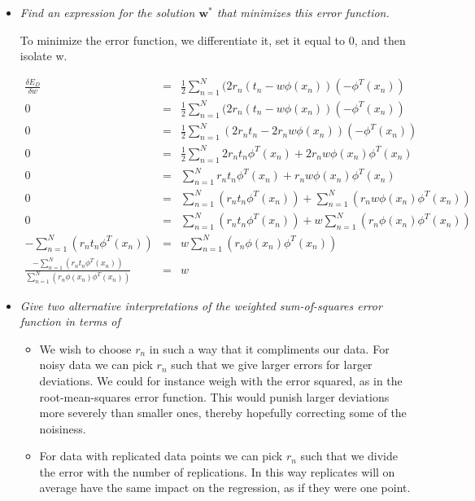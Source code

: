 \documentclass[12pt, a4paper]{article}
\begin{document}
\begin{itemize}
\item \textit{Find an expression for the solution $\textbf{w}^*$ that minimizes this error function.}

To minimize the error function, we differentiate it, set it equal to 0, and then isolate w.

\begin{eqnarray}
	\frac{\delta E_D}{\delta w} &=& \frac{1}{2}\sum^N_{n=1}(2r_n(t_n - w \phi (x_n))(-\phi^T (x_n))\\
	0 &=& \frac{1}{2}\sum^N_{n=1}(2r_n(t_n - w \phi (x_n))(-\phi^T (x_n))\\
	0 &=& \frac{1}{2}\sum^N_{n=1}(2r_nt_n - 2r_nw \phi (x_n))(-\phi^T (x_n))\\
	0 &=& \frac{1}{2}\sum^N_{n=1}2r_nt_n\phi^T (x_n) + 2r_nw \phi (x_n) \phi^T (x_n)\\	
	0 &=& \sum^N_{n=1}r_nt_n\phi^T (x_n) + r_nw \phi (x_n) \phi^T (x_n)\\
	0 &=& \sum^N_{n=1}(r_nt_n\phi^T (x_n)) + \sum^N_{n=1}(r_nw \phi (x_n) \phi^T (x_n))\\
	0 &=& \sum^N_{n=1}(r_nt_n\phi^T (x_n)) + w\sum^N_{n=1}(r_n \phi (x_n) \phi^T (x_n))\\
	-\sum^N_{n=1}(r_nt_n\phi^T (x_n)) &=& w\sum^N_{n=1}(r_n \phi (x_n) \phi^T (x_n))\\
	\frac{-\sum^N_{n=1}(r_nt_n\phi^T (x_n))}{\sum^N_{n=1}(r_n \phi (x_n) \phi^T (x_n))} &=& w
\end{eqnarray}


\item \textit{Give two alternative interpretations of the weighted sum-of-squares
error function in terms of}
\begin{itemize}

	\item We wish to choose $r_n$ in such a way that it compliments our data. For noisy data we can pick $r_n$ such that we give larger errors for larger deviations. We could for instance weigh with the error squared, as in the root-mean-squares error function. This would punish larger deviations more severely than smaller ones, thereby hopefully correcting some of the noisiness. 
	\item For data with replicated data points we can pick $r_n$ such that we divide the error with the number of replications. In this way replicates will on average have the same impact on the regression, as if they were one point.
 
\end{itemize}
\end{itemize}
\end{document}
